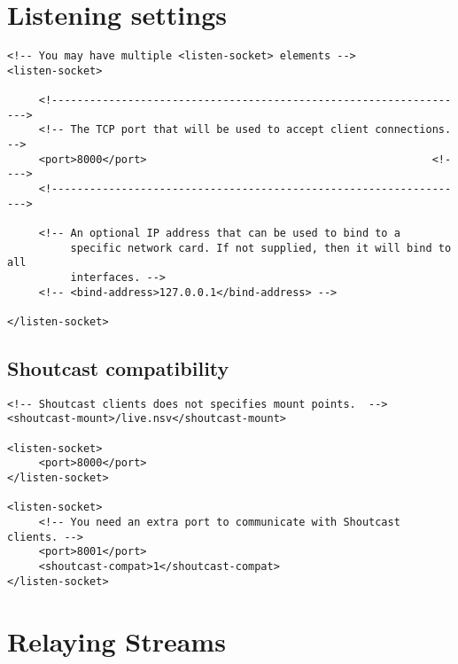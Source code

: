 
\section{Listening settings}


\begin{lstlisting}
<!-- You may have multiple <listen-socket> elements -->
<listen-socket>

     <!------------------------------------------------------------------>
     <!-- The TCP port that will be used to accept client connections. -->
     <port>8000</port>                                             <!---->
     <!------------------------------------------------------------------>

     <!-- An optional IP address that can be used to bind to a
          specific network card. If not supplied, then it will bind to all
          interfaces. -->
     <!-- <bind-address>127.0.0.1</bind-address> -->

</listen-socket>
\end{lstlisting}


\subsection{Shoutcast compatibility}

\begin{lstlisting}
<!-- Shoutcast clients does not specifies mount points.  -->
<shoutcast-mount>/live.nsv</shoutcast-mount>

<listen-socket>
     <port>8000</port>
</listen-socket>

<listen-socket>
     <!-- You need an extra port to communicate with Shoutcast clients. -->
     <port>8001</port>
     <shoutcast-compat>1</shoutcast-compat>
</listen-socket>
\end{lstlisting}



\section{Relaying Streams}


